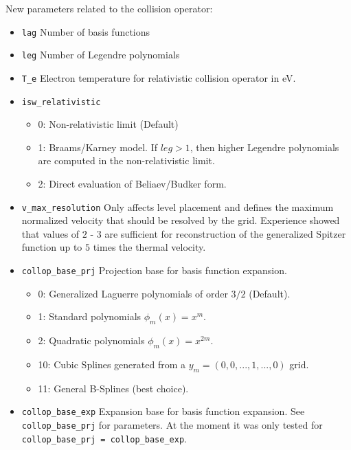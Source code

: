 \documentclass{article}
\begin{document}
New parameters related to the collision operator:
\begin{itemize}
 \item \verb|lag|\newline
 Number of basis functions
 \item \verb|leg|\newline
 Number of Legendre polynomials
 \item \verb|T_e|\newline
 Electron temperature for relativistic collision operator in eV.
 \item \verb|isw_relativistic|
 \begin{itemize}
  \item 0: Non-relativistic limit (Default)
  \item 1: Braams/Karney model. If $leg>1$, then higher Legendre
  polynomials are computed in the non-relativistic limit.
  \item 2: Direct evaluation of Beliaev/Budker form.
 \end{itemize}
 \item \verb|v_max_resolution|\newline
 Only affects level placement and defines the maximum normalized
 velocity that should be resolved by the grid. Experience showed that
 values of $2$ - $3$ are sufficient for reconstruction of the
 generalized Spitzer function up to $5$ times the thermal velocity.
 \item \verb|collop_base_prj|\newline
 Projection base for basis function expansion.
 \begin{itemize}
  \item 0: Generalized Laguerre polynomials of order $3/2$ (Default).
  \item 1: Standard polynomials $\phi_m(x) = x^m$.
  \item 2: Quadratic polynomials $\phi_m(x) = x^{2m}$.
  \item 10: Cubic Splines generated from a $y_m = (0, 0, ..., 1, ..., 0)$ grid.
  \item 11: General B-Splines (best choice).
 \end{itemize}

 \item \verb|collop_base_exp|\newline
 Expansion base for basis function expansion. See \verb|collop_base_prj|
 for parameters. At the moment it was only tested for
 \verb|collop_base_prj = collop_base_exp|.


\end{itemize}
\end{document}
